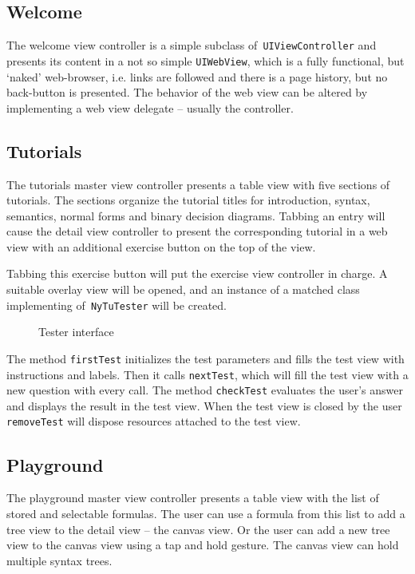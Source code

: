 \subsection{Welcome}

The welcome view controller is a simple subclass of\verb+ UIViewController+ 
and presents its content in a not so simple \verb+UIWebView+,
which is a fully functional, but ‘naked’ web-browser, i.e. links are followed and there is a page history, but no back-button is presented.
The behavior of the web view can be altered by implementing a web view delegate – usually the controller.

\subsection{Tutorials}

The tutorials master view controller presents a table view with five sections of tutorials.
The sections organize the tutorial titles for 
introduction, syntax, semantics, normal forms and binary decision diagrams.
Tabbing an entry will cause the detail view controller to present the corresponding tutorial in a web view
with an additional exercise button on the top of the view.

Tabbing this exercise button will put the exercise view controller in charge. 
A suitable overlay view will be opened, 
and an instance of a matched class implementing of\verb+ NyTuTester+ will be created.

\begin{figure}[htbp]
\begin{center}
\caption{Tester interface}
\label{fig:Tester}
\end{center}
\end{figure}

The method \verb+firstTest+ initializes the test parameters and fills the test view with instructions and labels. 
Then it calls \verb+nextTest+, which will fill the test view with a new question with every call.
The method \verb+checkTest+ evaluates the user's answer and displays the result in the test view.
When the test view is closed by the user \verb+removeTest+ will dispose resources attached to the test view.

\subsection{Playground}

The playground master view controller presents a table view with the list of stored and selectable formulas.
The user can use a formula from this list to add a tree view to the detail view – the canvas view.
Or the user can add a new tree view to the canvas view using a tap and hold gesture.
The canvas view can hold multiple syntax trees.


